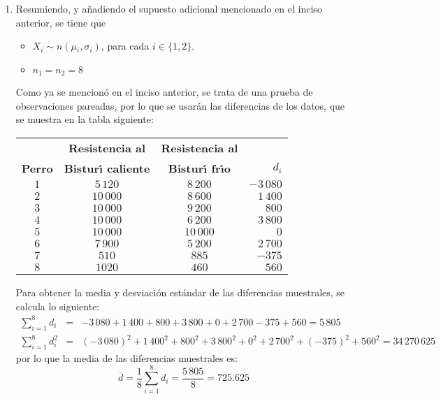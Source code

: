 \begin{solucion}
\begin{enumerate}
  \item
  \begin{datos}
   Resumiendo, y a\~nadiendo el supuesto adicional mencionado en el inciso anterior,
   se tiene que
   \begin{itemize}
    \item $X_i \sim n\left( \mu{}_i, \sigma_i \right)$, para cada $i \in \{1,2\}$.
    \item $n_1 = n_2 = 8$
   \end{itemize}
   Como ya se mencion\'o en el inciso anterior, se trata de una prueba
   de observaciones pareadas, por lo que se usar\'an las diferencias de los datos,
   que se muestra en la tabla siguiente:
   \begin{center}
    \begin{tabular}{cccr}
     & \textbf{Resistencia al} & \textbf{Resistencia al} & \\
     \textbf{Perro} & \textbf{Bistur\'{\i} caliente} &
     \textbf{Bistur\'{\i} fr\'{\i}o} & $d_i$ \\
     \hline
     $1$ & $5\,120$  & $8\,200$ & $-3\,080$ \\
     $2$ & $10\,000$ & $8\,600$ & $1\,400$  \\
     $3$ & $10\,000$ & $9\,200$ & $800$     \\
     $4$ & $10\,000$ & $6\,200$ & $3\,800$  \\
     $5$ & $10\,000$ & $10\,000$ & $0$      \\
     $6$ & $7\,900$  & $5\,200$ & $2\,700$  \\
     $7$ & $510$     & $885$    & $-375$    \\
     $8$ & $1020$    & $460$    & $560$
    \end{tabular}
   \end{center}
   Para obtener la media y desviaci\'on est\'andar de las diferencias muestrales,
   se calcula lo siguiente:
   \begin{eqnarray*}
    \sum_{i=1}^{8} d_i & = &
    -3\,080 + 1\,400 + 800 + 3\,800 + 0 + 2\,700 - 375 + 560 = 5\,805 \\
    \sum_{i=1}^{8} d_i^2 & = &
    (-3\,080)^2 + 1\,400^2 + 800^2 + 3\,800^2 + 0^2 + 2\,700^2 + (-375)^2 + 560^2
    = 34\,270\,625
   \end{eqnarray*}
   por lo que la media de las diferencias muestrales es:
   \begin{equation*}
    \overline{d} = \frac{1}{8}\sum_{i=1}^{8} d_i = \frac{5\,805}{8} = 725.625
   \end{equation*}

\end{datos}
\end{enumerate}
\end{solucion}
